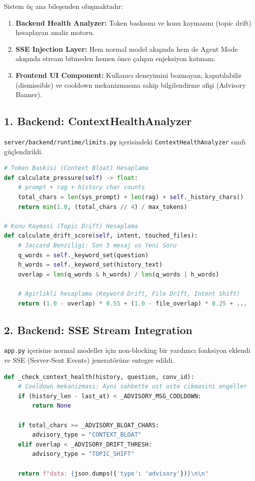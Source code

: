 \documentclass[12pt,a4paper]{report}
\begin{document}
Sistem üç ana bileşenden oluşmaktadır:
\begin{enumerate}
    \item \textbf{Backend Health Analyzer:} Token baskısını ve konu kaymasını (topic drift) hesaplayan analiz motoru.
    \item \textbf{SSE Injection Layer:} Hem normal model akışında hem de Agent Mode akışında stream bitmeden hemen önce çalışan enjeksiyon katmanı.
    \item \textbf{Frontend UI Component:} Kullanıcı deneyimini bozmayan, kapatılabilir (dismissible) ve cooldown mekanizmasına sahip bilgilendirme afişi (Advisory Banner).
\end{enumerate}

\subsection{1. Backend: ContextHealthAnalyzer}

\texttt{server/backend/runtime/limits.py} içerisindeki \texttt{ContextHealthAnalyzer} sınıfı güçlendirildi.

\begin{lstlisting}[language=Python]
# Token Baskisi (Context Bloat) Hesaplama
def calculate_pressure(self) -> float:
    # prompt + rag + history char counts
    total_chars = len(sys_prompt) + len(rag) + self._history_chars()
    return min(1.0, (total_chars // 4) / max_tokens)

# Konu Kaymasi (Topic Drift) Hesaplama
def calculate_drift_score(self, intent, touched_files):
    # Jaccard Benziligi: Son 3 mesaj vs Yeni Soru
    q_words = self._keyword_set(question)
    h_words = self._keyword_set(history_text)
    overlap = len(q_words & h_words) / len(q_words | h_words)
    
    # Agirlikli hesaplama (Keyword Drift, File Drift, Intent Shift)
    return (1.0 - overlap) * 0.55 + (1.0 - file_overlap) * 0.25 + ...
\end{lstlisting}

\subsection{2. Backend: SSE Stream Integration}

\texttt{app.py} içerisine normal modeller için non-blocking bir yardımcı fonksiyon eklendi ve SSE (Server-Sent Events) jeneratörüne entegre edildi.

\begin{lstlisting}[language=Python]
def _check_context_health(history, question, conv_id):
    # Cooldown mekanizmasi: Ayni sohbette ust uste cikmasini engeller
    if (history_len - last_at) < _ADVISORY_MSG_COOLDOWN:
        return None

    if total_chars >= _ADVISORY_BLOAT_CHARS:
        advisory_type = "CONTEXT_BLOAT"
    elif overlap < _ADVISORY_DRIFT_THRESH:
        advisory_type = "TOPIC_SHIFT"
        
    return f"data: {json.dumps({'type': 'advisory'})}\n\n"
\end{lstlisting}
\end{document}
